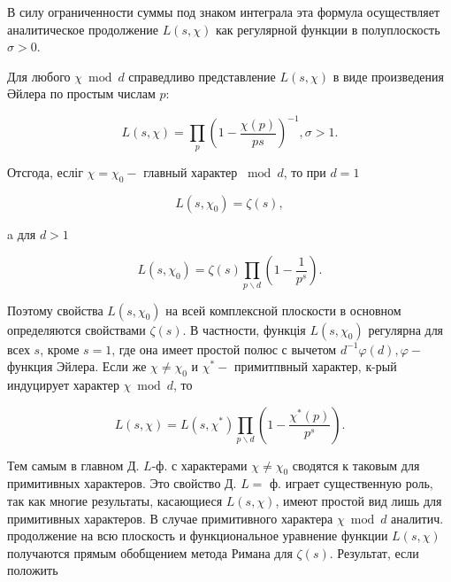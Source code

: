 \documentclass[10pt]{article}
\begin{document}
В силу ограниченности суммы под знаком интеграла эта формула осуществляет аналитическое продолжение $L(s, \chi)$ как регулярной функции в полуплоскость $\sigma>0$.



Для любого $\chi \bmod d$ справедливо представление $L(s, \chi)$ в виде произведения Әйлера по простым числам $p:$



\[

L(s, \chi)=\prod_{p}\left(1-\frac{\chi(p)}{p s}\right)^{-1}, \sigma>1 .

\]



Отсгода, есліг $\chi=\chi_{0}-$ главный характер $\bmod d$, то при $d=1$



\[

L\left(s, \chi_{0}\right)=\zeta(s),

\]



a для $d>1$



\[

L\left(s, \chi_{0}\right)=\zeta(s) \prod_{p \backslash d}\left(1-\frac{1}{p^{s}}\right) .

\]



Поэтому свойства $L\left(s, \chi_{0}\right)$ на всей комплексной плоскости в основном определяются свойствами $\zeta(s)$. В частности, функція $L\left(s, \chi_{0}\right)$ регулярна для всех $s$, кроме $s=1$, где она имеет простой полюс с вычетом $d^{-1} \varphi(d), \varphi-$ функция Эйлера. Если же $\chi \neq \chi_{0}$ и $\chi^{*}-$ примитпвный характер, к-рый индуцирует характер $\chi \bmod d$, то



\[

L(s, \chi)=L\left(s, \chi^{*}\right) \prod_{p \backslash d}\left(1-\frac{\chi^{*}(p)}{p^{s}}\right) .

\]



Тем самым в главном Д. $L$-ф. с характерами $\chi \neq \chi_{0}$ сводятся к таковым для примитивных характеров. Это свойство Д. $L=$ ф. играет существенную роль, так как многие результаты, касающиеся $L(s, \chi)$, имеют простой вид лишь для примитивных характеров. В случае примитивного характера $\chi \bmod d$ аналитич. продолжение на всю плоскость и функциональное уравнение функции $L(s, \chi)$ получаются прямым обобщением метода Римана для $\zeta(s)$. Результат, если положить
\end{document}
